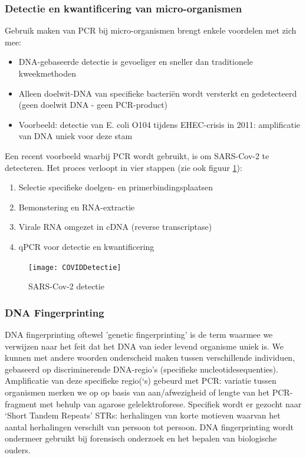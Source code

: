 \documentclass[a4paper,kul]{kulakarticle} %
\begin{document}
\subsubsection{Detectie en kwantificering van micro-organismen}
Gebruik maken van PCR bij micro-organismen brengt enkele voordelen met zich mee:
\begin{itemize}
	\item DNA-gebaseerde detectie is gevoeliger en sneller dan traditionele
	kweekmethoden
	\item Alleen doelwit-DNA van specifieke bacteriën wordt versterkt en
	gedetecteerd (geen doelwit DNA - geen PCR-product)
	\item Voorbeeld: detectie van E. coli O104 tijdens EHEC-crisis in 2011:
	amplificatie van DNA uniek voor deze stam
\end{itemize}
Een recent voorbeeld waarbij PCR wordt gebruikt, is om SARS-Cov-2 te detecteren. Het proces verloopt in vier stappen (zie ook figuur \ref{fig:coviddetectie}): 
\begin{enumerate}
	\item Selectie specifieke doelgen- en primerbindingsplaatsen
	\item Bemonstering en RNA-extractie
	\item Virale RNA omgezet in cDNA (reverse transcriptase)
	\item qPCR voor detectie en kwantificering
\end{enumerate}
\begin{figure}[h]
	\centering
	\texttt{[image: COVIDDetectie]}
	\caption[Covid detectie]{SARS-Cov-2 detectie}
	\label{fig:coviddetectie}
\end{figure}
\newpage
\subsubsection{DNA Fingerprinting}
DNA fingerprinting oftewel 'genetic fingerprinting' is de term waarmee we verwijzen naar het feit dat het DNA van ieder levend organisme uniek is. We kunnen met andere woorden onderscheid maken tussen verschillende individuen, gebaseerd op discriminerende DNA-regio's (specifieke nucleotidesequenties). Amplificatie van deze specifieke regio(‘s) gebeurd met PCR: variatie tussen organismen merken we op op basis van aan/afwezigheid of lengte van het PCR-fragment met behulp van agarose gelelektroforese. Specifiek wordt er gezocht naar `Short Tandem Repeats' STRs: herhalingen van korte motieven waarvan het aantal herhalingen verschilt van persoon tot persoon. DNA fingerprinting wordt ondermeer gebruikt bij forensisch onderzoek en het bepalen van biologische ouders. 
\end{document}
